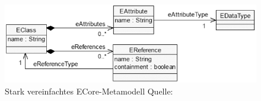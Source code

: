 \begin{figure}[H]
\centering
\includegraphics[width=\linewidth]{Abschnitte/Abbildungen/Grafiken/ecore-simple}
\caption{Stark vereinfachtes ECore-Metamodell Quelle: \cite{steinberg2008emf}}
\label{fig:ecore_simple}
\end{figure}